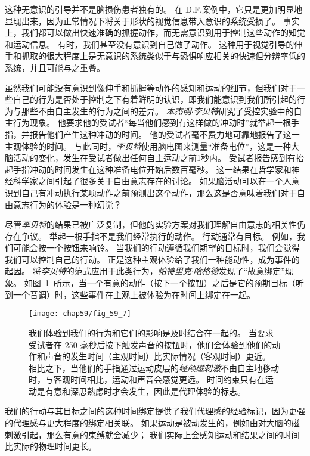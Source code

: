 这种无意识的引导并不是脑损伤患者独有的。
在 D.F.案例中，它只是更加明显地显现出来，因为正常情况下将关于形状的视觉信息带入意识的系统受损了。
事实上，我们都可以做出快速准确的抓握动作，而无需意识到用于控制这些动作的知觉和运动信息。
有时，我们甚至没有意识到自己做了动作。
这种用于视觉引导的伸手和抓取的很大程度上是无意识的系统类似于与恐惧响应相关的快速但分辨率低的系统，并且可能与之重叠。


虽然我们可能没有意识到像伸手和抓握等动作的感知和运动的细节，但我们对于一些自己的行为是否处于控制之下有着鲜明的认识，即我们能意识到我们所引起的行为与那些不由自主发生的行为之间的差异。
\textit{本杰明$\cdot$李贝特}研究了受控实验中的自主行为现象。
他要求他的受试者“每当他们感到有这样做的冲动时”就举起一根手指，并报告他们产生这种冲动的时间。
他的受试者毫不费力地可靠地报告了这一主观体验的时间。
与此同时，\textit{李贝特}使用脑电图来测量“准备电位”，这是一种大脑活动的变化，发生在受试者做出任何自主运动之前1秒内。
受试者报告感到有抬起手指冲动的时间发生在这种准备电位开始后数百毫秒。
这一结果在哲学家和神经科学家之间引起了很多关于自由意志存在的讨论。
如果脑活动可以在一个人意识到自己有冲动执行某项动作之前预测出这个动作，那么这是否意味着我们对于自由意志行为的体验是一种幻觉？


尽管\textit{李贝特}的结果已被广泛复制，但他的实验方案对我们理解自由意志的相关性仍存在争议。
举起一根手指不是我们经常执行的动作。
行动通常有目标。
例如，我们可能会按一个按钮来响铃。
当我们的行动遵循我们期望的目标时，我们会觉得我们可以控制自己的行动。
正是这种主观体验给了我们一种能动性，成为事件的起因。
将\textit{李贝特}的范式应用于此类行为，\textit{帕特里克$\cdot$哈格德}发现了“故意绑定”现象。
如图~\ref{fig:59_7}~所示，当一个有意的动作（按下一个按钮）之后是它的预期目标（听到一个音调）时，这些事件在主观上被体验为在时间上绑定在一起。


\begin{figure}[htbp]
	\centering
	\texttt{[image: chap59/fig\_59\_7]}
	\caption{我们体验到我们的行为和它们的影响是及时结合在一起的。
		当要求受试者在 250 毫秒后按下触发声音的按钮时，他们会体验到他们的动作和声音的发生时间（主观时间）比实际情况（客观时间）更近。
		相比之下，当他们的手指通过运动皮层的\textit{经颅磁刺激}不由自主地移动时，与客观时间相比，运动和声音会感觉更远。
		时间约束只有在运动是有意和深思熟虑时才会发生，因此是代理体验的标志\cite{haggard2002voluntary}。}
	\label{fig:59_7}
\end{figure}


我们的行动与其目标之间的这种时间绑定提供了我们代理感的经验标记，因为更强的代理感与更大程度的绑定相关联。
如果运动是被动发生的，例如由对大脑的磁刺激引起，那么有意的束缚就会减少；
我们实际上会感知运动和结果之间的时间比实际的物理时间更长。

